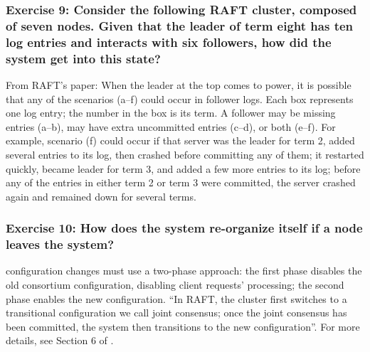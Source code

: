 \documentclass[12pt,a4paper]{article}
\begin{document}
\subsubsection*{Exercise 9: Consider the following RAFT cluster, composed of seven nodes. Given that the leader of term eight has ten log entries and interacts with six followers, how did the system get into this state?}

From RAFT's paper: When the leader at the top comes to power, it is
possible that any of the scenarios (a–f) could occur in follower
logs. Each box represents one log entry; the number in the box is its term. A follower may be missing entries (a–b), may
have extra uncommitted entries (c–d), or both (e–f). For example, scenario (f) could occur if that server was the leader
for term 2, added several entries to its log, then crashed before
committing any of them; it restarted quickly, became leader
for term 3, and added a few more entries to its log; before any
of the entries in either term 2 or term 3 were committed, the
server crashed again and remained down for several terms.

\subsubsection*{Exercise 10: How does the system re-organize itself if a node leaves the system?}

configuration changes must
use a two-phase approach: the first phase disables the old consortium configuration, disabling client requests' processing; the second phase enables the new configuration. ``In RAFT, the cluster first switches to a transitional configuration we call joint
consensus; once the joint consensus has been committed, the system then transitions to the new configuration''.
For more details, see Section 6 of \cite{raft_paper}.


\end{document}
